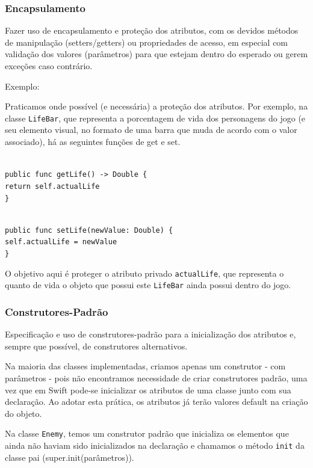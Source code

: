 \documentclass[rel_mlp]{iiufrgs}
\newcommand\tab[1][1cm]{\hspace*{#1}}
\begin{document}

\subsubsection{Encapsulamento}

Fazer uso de encapsulamento e proteção dos atributos, com os devidos métodos de manipulação (setters/getters) ou propriedades de acesso, em especial com validação dos valores (parâmetros) para que estejam dentro do esperado ou gerem exceções caso contrário.

Exemplo:

Praticamos onde possível (e necessária) a proteção dos atributos. Por exemplo, na classe \texttt{LifeBar}, que representa a porcentagem de vida dos personagens do jogo (e seu elemento visual, no formato de uma barra que muda de acordo com o valor associado), há as seguintes funções de get e set.

\texttt{\\public func getLife() -> Double \{\\\tab return self.actualLife\\\}}

\texttt{\\public func setLife(newValue: Double) \{\\\tab self.actualLife = newValue\\\}}
    
O objetivo aqui é proteger o atributo privado \texttt{actualLife}, que representa o quanto de vida o objeto que possui este \texttt{LifeBar} ainda possui dentro do jogo.


\subsubsection{Construtores-Padrão}

Especificação e uso de construtores-padrão para a inicialização dos atributos e, sempre que possível, de construtores alternativos.

Na maioria das classes implementadas, criamos apenas um construtor - com parâmetros - pois não encontramos necessidade de criar construtores padrão, uma vez que em Swift pode-se inicializar os atributos de uma classe junto com sua declaração. Ao adotar esta prática, os atributos já terão valores default na criação do objeto.

Na classe \texttt{Enemy}, temos um construtor padrão que inicializa os elementos que ainda não haviam sido inicializados na declaração e chamamos o método \texttt{init} da classe pai (super.init(parâmetros)).
\end{document}
